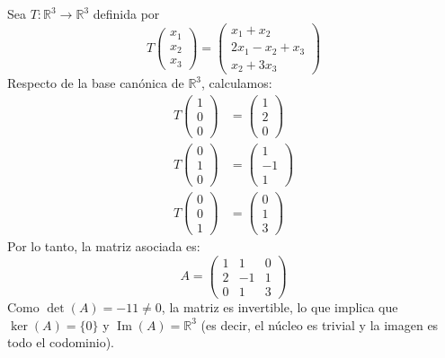 \begin{example}
Sea $T: \mathbb{R}^3 \to \mathbb{R}^3$ definida por
\[
T\begin{pmatrix} x_1 \\ x_2 \\ x_3 \end{pmatrix} = \begin{pmatrix} x_1 + x_2 \\ 2x_1 - x_2 + x_3 \\ x_2 + 3x_3 \end{pmatrix}
\]
Respecto de la base canónica de $\mathbb{R}^3$, calculamos:
\begin{align*}
T\begin{pmatrix} 1 \\ 0 \\ 0 \end{pmatrix} &= \begin{pmatrix} 1 \\ 2 \\ 0 \end{pmatrix} \\
T\begin{pmatrix} 0 \\ 1 \\ 0 \end{pmatrix} &= \begin{pmatrix} 1 \\ -1 \\ 1 \end{pmatrix} \\
T\begin{pmatrix} 0 \\ 0 \\ 1 \end{pmatrix} &= \begin{pmatrix} 0 \\ 1 \\ 3 \end{pmatrix}
\end{align*}
Por lo tanto, la matriz asociada es:
\[
A = \begin{pmatrix}
1 & 1 & 0 \\
2 & -1 & 1 \\
0 & 1 & 3
\end{pmatrix}
\]
Como $\det(A) = -11 \neq 0$, la matriz es invertible, lo que implica que $\ker(A) = \{0\}$ y $\operatorname{Im}(A) = \mathbb{R}^3$ (es decir, el núcleo es trivial y la imagen es todo el codominio).
\end{example}

